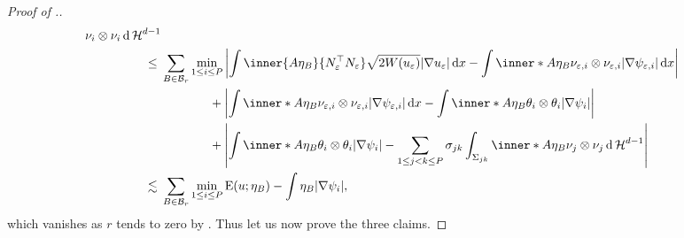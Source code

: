 \begin{proof}[Proof of .]
\begin{align*}
{			{ \nu_{ i } \otimes \nu_{i } }
			\dd{ \hm^{ d - 1 } }
		}
		\\
		\leq{} &
		\sum_{ B \in \mathcal{ B }_{ r } }
		\min_{ 1 \leq i \leq P }
		\abs{ 
			\int
			\inner{ A \eta_{ B } }{ N_{ \varepsilon }^{ \top } N_{ \varepsilon 
			} }
			\sqrt{ 2 W ( u_{ \varepsilon } ) }
			\abs{ \nabla u_{ \varepsilon } }
			\dd{ x }
			-
			\int
			\inner*{ A \eta_{ B } }
			{ \nu_{ \varepsilon , i }\otimes \nu_{ \varepsilon ,i } 
			}
			\abs{ \nabla \psi_{ \varepsilon,  i } }
			\dd{ x }
		}
		\\
		& \quad \quad \quad \;\;\;\!\: +
		\abs{ 
			\int
			\inner*{ A \eta_{ B } }{ \nu_{ \varepsilon ,i } \otimes 
				\nu_{ \varepsilon , i } }
			\abs{ \nabla \psi_{ \varepsilon, i } }
			\dd{ x }
			-
			\int
			\inner*{ A \eta_{ B } }
			{ \theta_{ i } \otimes \theta_{ i } }
			\abs{ \nabla \psi_{ i } }
		}
		\\
		& \quad \quad \quad \;\;\;\!\: +
		\abs{ 
			\int
			\inner*{ A \eta_{ B } }
			{ \theta_{ i } \otimes \theta_{ i } }
			\abs{ \nabla \psi_{ i } }
			-
			\sum_{ 1 \leq j < k \leq P }
			\sigma_{ j k }
			\int_{ \Sigma_{ j k } }
			\inner*{ A \eta_{ B } }
			{ \nu_{ j } \otimes \nu_{ j } }
			\dd{ \hm^{ d - 1 } }
		}
		\\
		\lesssim {} &
		\sum_{ B \in \mathcal{ B }_{ r } }
		\min_{ 1 \leq i \leq P }
		\energy ( u ; \eta_{ B } )
		-
		\int
		\eta_{ B }
		\abs{ \nabla \psi_{ i } },
	\end{align*}
	which vanishes as $ r $ tends to zero by 
	.
	Thus let us now prove the three claims.
	

\end{proof}

